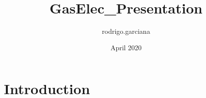\documentclass{article}
\title{GasElec_Presentation}
\author{rodrigo.garciana }
\date{April 2020}
\begin{document}
\maketitle

\section{Introduction}
\end{document}

